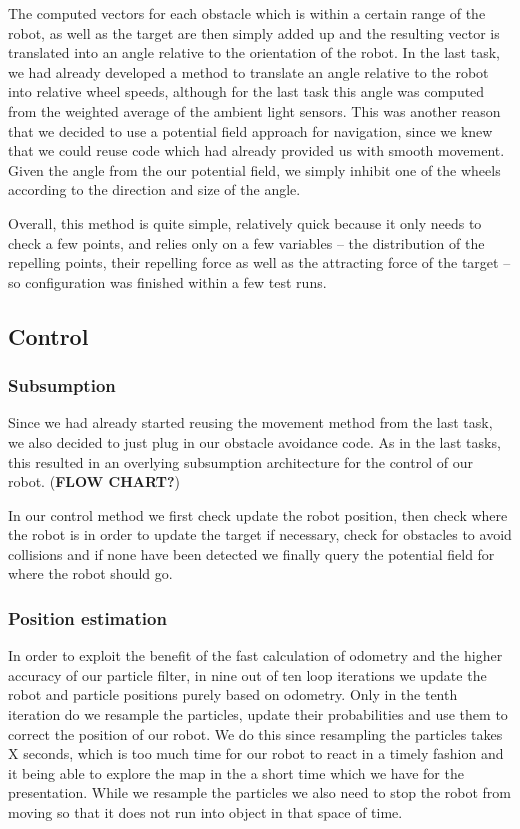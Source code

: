 \documentclass[paper=a4, fontsize=12pt]{scrartcl}	%
\numberwithin{equation}{section}		%
\numberwithin{figure}{section}			%
\numberwithin{table}{section}				%
\begin{document}
The computed vectors for each obstacle which is within a certain range of the robot, as well as the target are then simply added up and the resulting vector is translated into an angle relative to the orientation of the robot. In the last task, we had already developed a method to translate an angle relative to the robot into relative wheel speeds, although for the last task this angle was computed from the weighted average of the ambient light sensors. This was another reason that we decided to use a potential field approach for navigation, since we knew that we could reuse code which had already provided us with smooth movement. Given the angle from the our potential field, we simply inhibit one of the wheels according to the direction and size of the angle.

Overall, this method is quite simple, relatively quick because it only needs to check a few points, and relies only on a few variables – the distribution of the repelling points, their repelling force as well as the attracting force of the target – so configuration was finished within a few test runs.

\subsection{Control}
\subsubsection{Subsumption}
Since we had already started reusing the movement method from the last task, we also decided to just plug in our obstacle avoidance code. As in the last tasks, this resulted in an overlying subsumption architecture for the control of our robot. (\textbf{FLOW CHART?})

In our control method we first check update the robot position, then check where the robot is in order to update the target if necessary, check for obstacles to avoid collisions and if none have been detected we finally query the potential field for where the robot should go.
\subsubsection{Position estimation}
In order to exploit the benefit of the fast calculation of odometry and the higher accuracy of our particle filter, in nine out of ten loop iterations we update the robot and particle positions purely based on odometry. Only in the tenth iteration do we resample the particles, update their probabilities and use them to correct the position of our robot. We do this since resampling the particles takes X seconds, which is too much time for our robot to react in a timely fashion and it being able to explore the map in the a short time which we have for the presentation. While we resample the particles we also need to stop the robot from moving so that it does not run into object in that space of time.
\end{document}
